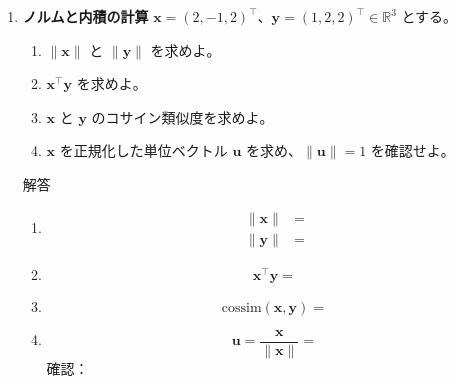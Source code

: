 \documentclass[a4paper,dvipdfmx]{jsarticle}
\newcommand{\学籍番号}{0000000}
\newcommand{\氏名}{氏名を書く}
\newcommand{\提出日}{2026年10月8日}
\newenvironment{answer}{\begin{itembox}[l]{解答}}{\end{itembox}}
\begin{document}
\begin{enumerate}
  \item \textbf{ノルムと内積の計算}\quad
    $\bm{x} = (2, -1, 2)^\top$、$\bm{y} = (1, 2, 2)^\top \in \mathbb{R}^3$ とする。
    \begin{enumerate}
      \item $\|\bm{x}\|$ と $\|\bm{y}\|$ を求めよ。
      \item $\bm{x}^\top \bm{y}$ を求めよ。
      \item $\bm{x}$ と $\bm{y}$ のコサイン類似度を求めよ。
      \item $\bm{x}$ を正規化した単位ベクトル $\bm{u}$ を求め、$\|\bm{u}\| = 1$ を確認せよ。
    \end{enumerate}
    \begin{answer}
      \begin{enumerate}
        \item
          \begin{align*}
            \|\bm{x}\| &= \\
            \|\bm{y}\| &=
          \end{align*}
        \item
          \begin{equation*}
            \bm{x}^\top \bm{y} =
          \end{equation*}
        \item
          \begin{equation*}
            \mathrm{cossim}(\bm{x}, \bm{y}) =
          \end{equation*}
        \item
          \begin{equation*}
            \bm{u} = \frac{\bm{x}}{\|\bm{x}\|} =
          \end{equation*}
          確認：
      \end{enumerate}
    \end{answer}


\end{enumerate}
\end{document}
